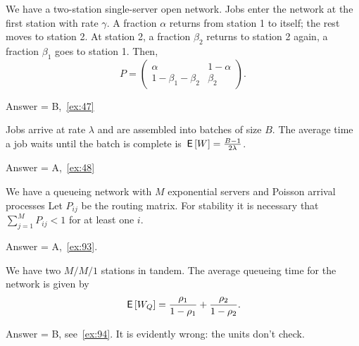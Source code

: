 \begin{exercise}[201904]
 We have a two-station single-server open network.
 Jobs enter the network at the first station with rate $\gamma$.
 A fraction $\alpha$ returns from station 1 to itself; the rest moves to station 2.
 At station 2, a fraction $\beta_2$ returns to station 2 again, a fraction $\beta_1$ goes to station 1.
 Then,
 \begin{equation*}
 P = 
 \begin{pmatrix}
 \alpha & 1- \alpha \\
 1- \beta_1-\beta_2 & \beta_2
 \end{pmatrix}.
 \end{equation*}
\begin{solution} Answer = B,~\cref{ex:47}
\end{solution}
\end{exercise}

\begin{exercise}[201904]
 Jobs arrive at rate $\lambda$ and are assembled into batches of size $B$.
 The average time a job waits until the batch is complete is $\,\mathsf{E}\left[W\right] = \frac{B-1}{2\lambda}$.
\begin{solution}Answer = A,~\cref{ex:48}
\end{solution}
\end{exercise}


\begin{exercise}[201907]
 We have a queueing network with $M$ exponential servers and Poisson arrival processes
 Let $P_{ij}$ be the routing matrix.
 For stability it is necessary that $\sum_{j=1}^M P_{i j} <1$ for at least one $i$. 
\begin{solution}
Answer = A,~\cref{ex:93}.
\end{solution}
\end{exercise}



\begin{exercise}[201907]
We have two $M/M/1$ stations in tandem. The average queueing time for the network is given by
\begin{equation}
\,\mathsf{E}\left[W_Q\right] = \frac{\rho_1}{1-\rho_1} + \frac{\rho_2}{1-\rho_2}.
\end{equation}
\begin{solution}
Answer = B, see~\cref{ex:94}. It is evidently wrong: the units don't check.
\end{solution}
\end{exercise}


